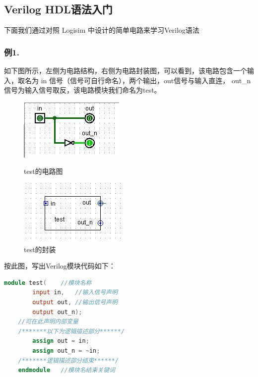 \documentclass[UTF8]{article}
\begin{document}
	\subsection{Verilog HDL语法入门}
	下面我们通过对照 Logisim 中设计的简单电路来学习Verilog语法\\
	
	\subsubsection*{例1.}如下图所示，左侧为电路结构，右侧为电路封装图，可以看到，该电路包含一个输入，取名为 in 信号（信号可自行命名），两个输出，out信号与输入直连， out\_n 信号为输入信号取反，该电路模块我们命名为test。\par
	\begin{figure}[H]
		\begin{minipage}[H]{0.45\linewidth}
			\centering
			\includegraphics[scale=1]{CurcuitTest.jpg}
			\caption{test的电路图}
			\label{CurcuitTest}
		\end{minipage}
		\begin{minipage}[H]{0.6\linewidth}
			\centering
			\includegraphics[scale=1]{ModuleTest.jpg}
			\caption{test的封装}
			\label{ModuleTest}
		\end{minipage}
	\end{figure}\par
	按此图，写出Verilog模块代码如下：\par
	\begin{lstlisting}[language=Verilog]
	module test(	//模块名称
		input in,	//输入信号声明
		output out,	//输出信号声明
		output out_n);
	//可在此声明内部变量
	/*******以下为逻辑描述部分******/
		assign out = in;
		assign out_n = ~in;
	/*******逻辑描述部分结束******/
	endmodule   //模块名结束关键词
	\end{lstlisting}
	
\end{document}
